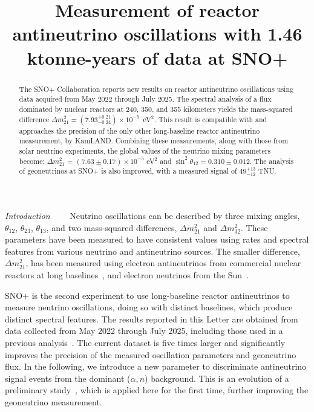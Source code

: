 \documentclass[%
 reprint,
superscriptaddress,
 amsmath,amssymb,
 aps,
]{revtex4-2}
\newcommand{\alphan}{($\alpha, n$) }
\begin{document}

\title{Measurement of reactor antineutrino oscillations with 1.46 ktonne-years of data at SNO+}




\begin{abstract}
\newpage
The SNO+ Collaboration reports new results on reactor antineutrino oscillations using data acquired from May 2022 through July 2025. 
The spectral analysis of a flux dominated by nuclear reactors at 240, 350, and 355 kilometers yields the mass-squared difference $\Delta m^2_{21}=(7.93^{+0.21}_{-0.24})\times 10^{-5}$~eV$^2$.  
This result is compatible with and approaches the precision of the only other long-baseline reactor antineutrino measurement, by KamLAND. 
Combining these measurements, along with those from solar neutrino experiments, the global values of the neutrino mixing parameters become: 
$\Delta m^2_{21}$ = $(7.63\pm0.17)\times 10^{-5}$ eV$^2$ and $\sin^2{\theta_{12}}=0.310\pm0.012$. 
The analysis of geoneutrinos at SNO+ is also improved, with a measured signal of 49$^{+13}_{-12}$ TNU. 
\end{abstract}



\maketitle


\textit{Introduction}~~\textemdash~~
Neutrino oscillations can be described by three mixing angles, $\theta_{12}$, $\theta_{23}$, $\theta_{13}$, and two mass-squared differences, $\Delta m_{21}^2$ and $\Delta m_{32}^2$. These parameters have been measured to have consistent values using rates and spectral features from various neutrino and antineutrino sources. The smaller difference, $\Delta m_{21}^2$, has been measured using electron antineutrinos from commercial nuclear reactors at long baselines~\cite{kamland_on_off, sno+ppo}, and electron neutrinos from the Sun~\cite{Super-Kamiokande_solar}.  

SNO+ is the second experiment to use long-baseline reactor antineutrinos to measure neutrino oscillations, doing so with distinct baselines, which produce distinct spectral features.  
The results reported in this Letter are obtained from data collected from May 2022 through July 2025, including those used in a previous analysis~\cite{sno+ppo}. 
The current dataset is five times larger and significantly improves the precision of the measured oscillation parameters and geoneutrino flux. 
In the following, we introduce a new parameter to discriminate antineutrino signal events from the dominant \alphan background. This is an evolution of a preliminary study~\cite{snoplus_partial_antinu}, which is applied here for the first time, further improving the geoneutrino measurement. 
\end{document}
